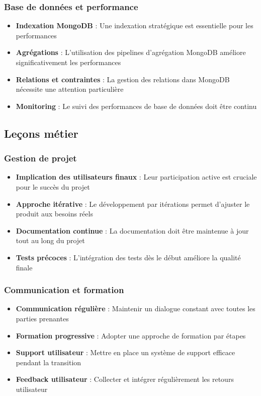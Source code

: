 \subsubsection{Base de données et performance}
\begin{itemize}
    \item \textbf{Indexation MongoDB} : Une indexation stratégique est essentielle pour les performances
    \item \textbf{Agrégations} : L'utilisation des pipelines d'agrégation MongoDB améliore significativement les performances
    \item \textbf{Relations et contraintes} : La gestion des relations dans MongoDB nécessite une attention particulière
    \item \textbf{Monitoring} : Le suivi des performances de base de données doit être continu
\end{itemize}

\subsection{Leçons métier}
\subsubsection{Gestion de projet}
\begin{itemize}
    \item \textbf{Implication des utilisateurs finaux} : Leur participation active est cruciale pour le succès du projet
    \item \textbf{Approche itérative} : Le développement par itérations permet d'ajuster le produit aux besoins réels
    \item \textbf{Documentation continue} : La documentation doit être maintenue à jour tout au long du projet
    \item \textbf{Tests précoces} : L'intégration des tests dès le début améliore la qualité finale
\end{itemize}

\subsubsection{Communication et formation}
\begin{itemize}
    \item \textbf{Communication régulière} : Maintenir un dialogue constant avec toutes les parties prenantes
    \item \textbf{Formation progressive} : Adopter une approche de formation par étapes
    \item \textbf{Support utilisateur} : Mettre en place un système de support efficace pendant la transition
    \item \textbf{Feedback utilisateur} : Collecter et intégrer régulièrement les retours utilisateur
\end{itemize}

